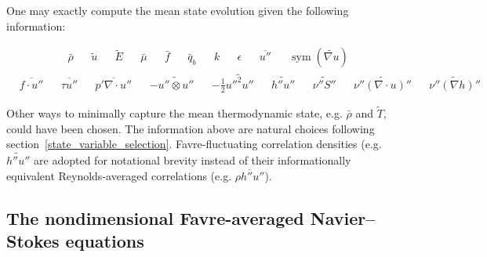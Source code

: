 \documentclass[letterpaper,11pt,nointlimits,reqno,draft]{amsart}
\newcommand{\symmetricpart}[1]
  {\ensuremath{\operatorname{sym}\left(#1\right)}}
\begin{document}
One may exactly compute the mean state evolution given the following
information:
\begin{samepage}
\begin{align}
&\bar{\rho}
&
&\tilde{u}
&
&\tilde{E}
&
&\bar{\mu}
&
&\bar{f}
&
&\bar{q}_b
&
&k
&
&\epsilon
&
&\overline{u''}
&
&\symmetricpart{\widetilde{\nabla{}u}}
\end{align}
\begin{align}
&\overline{f\cdot{}u''}
&
&\overline{\tau{}u''}
&
&\overline{p'\nabla\cdot{}u''}
&
&-\widetilde{u''\otimes{}u''}
&
&-\frac{1}{2}\widetilde{{u''}^{2}u''}
&
&\widetilde{h''u''}
&
&\widetilde{\nu''S''}
&
&\widetilde{\nu''\left(\nabla\cdot{}u\right)''}
&
&\widetilde{\nu''\left(\nabla{}h\right)''}
\end{align}
\end{samepage}
Other ways to minimally capture the mean thermodynamic state, e.g. $\bar{\rho}$
and $\tilde{T}$, could have been chosen.  The information above are natural
choices following section~\ref{state_variable_selection}.  Favre-fluctuating
correlation densities (e.g.  $\widetilde{h''u''}$ are adopted for notational
brevity instead of their informationally equivalent Reynolds-averaged
correlations (e.g.  $\overline{\rho{}h''u''}$).

\subsection{The nondimensional Favre-averaged Navier--Stokes equations}
\label{sec:nondimfans}
\end{document}
